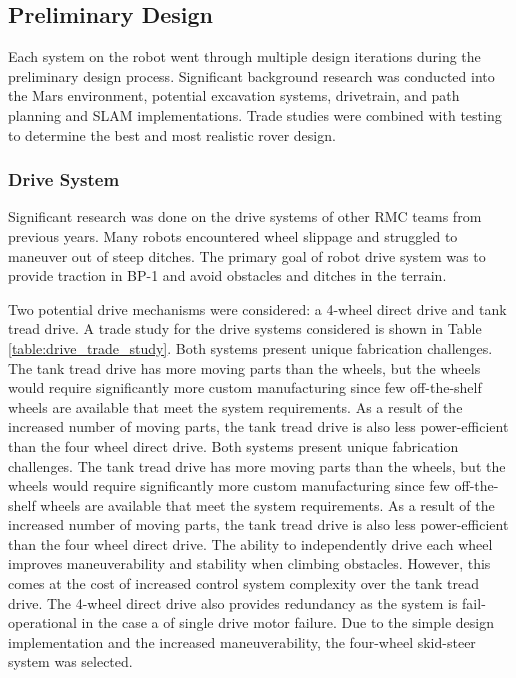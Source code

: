 \documentclass[class=article, crop=false]{standalone}
\begin{document}
	\subsection{Preliminary Design}
	\label{subsec:preliminary_design}
	Each system on the robot went through multiple design iterations during the preliminary design process. Significant background research was conducted into the Mars environment, potential excavation systems, drivetrain, and path planning and SLAM implementations. Trade studies were combined with testing to determine the best and most realistic rover design.
	\subsubsection{Drive System}
	Significant research was done on the drive systems of other RMC teams from previous years. Many robots encountered wheel slippage and struggled to maneuver out of steep ditches. The primary goal of robot drive system was to provide traction in BP-1 and avoid obstacles and ditches in the terrain. 
	
Two potential drive mechanisms were considered: a 4-wheel direct drive and tank tread drive. A trade study for the drive systems considered is shown in Table \ref{table:drive_trade_study}. Both systems present unique fabrication challenges. The tank tread drive has more moving parts than the wheels, but the wheels would require significantly more custom manufacturing since few off-the-shelf wheels are available that meet the system requirements. As a result of the increased number of moving parts, the tank tread drive is also less power-efficient than the four wheel direct drive.  Both systems present unique fabrication challenges. The tank tread drive has more moving parts than the wheels, but the wheels would require significantly more custom manufacturing since few off-the-shelf wheels are available that meet the system requirements. As a result of the increased number of moving parts, the tank tread drive is also less power-efficient than the four wheel direct drive.  The ability to independently drive each wheel improves maneuverability and stability when climbing obstacles. However, this comes at the cost of increased control system complexity over the tank tread drive.   The 4-wheel direct drive also provides redundancy as the system is fail-operational in the case a of single drive motor failure. Due to the simple design implementation and the increased maneuverability, the four-wheel skid-steer system was selected.
\end{document}
